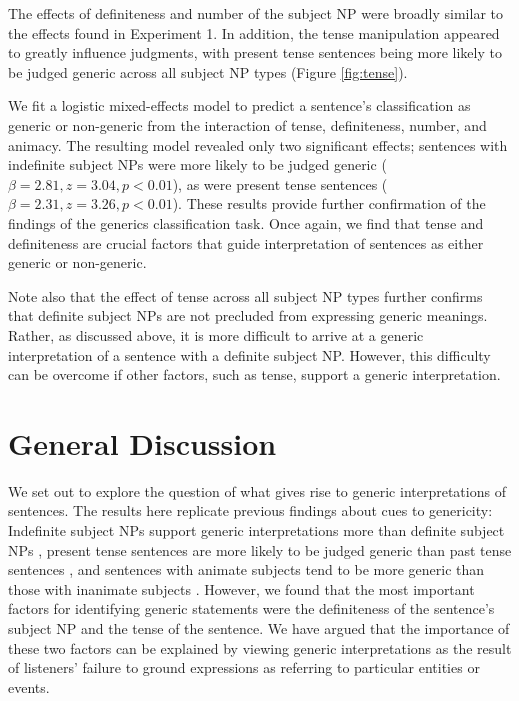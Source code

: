 \documentclass[10pt,letterpaper]{article}
\begin{document}
The effects of definiteness and number of the subject NP were broadly similar to the effects found in Experiment 1. In addition, the tense manipulation appeared to greatly influence judgments, with present tense sentences being more likely to be judged generic across all subject NP types (Figure \ref{fig:tense}).

We fit a logistic mixed-effects model to predict a sentence's classification as generic or non-generic from the interaction of tense, definiteness, number, and animacy. The resulting model revealed only two significant effects; sentences with indefinite subject NPs were more likely to be judged generic (\(\beta = 2.81, z = 3.04, p < 0.01\)), as were present tense sentences (\(\beta = 2.31, z = 3.26, p < 0.01\)). These results provide further confirmation of the findings of the generics classification task. Once again, we find that tense and definiteness are crucial factors that guide interpretation of sentences as either generic or non-generic.

Note also that the effect of tense across all subject NP types further confirms that definite subject NPs are not precluded from expressing generic meanings. Rather, as discussed above, it is more difficult to arrive at a generic interpretation of a sentence with a definite subject NP. However, this difficulty can be overcome if other factors, such as tense, support a generic interpretation.

\section{General Discussion}

We set out to explore the question of what gives rise to generic interpretations of sentences. The results here replicate previous findings about cues to genericity: Indefinite subject NPs support generic interpretations more than definite subject NPs \cite{Cimpian:2011, Gelman:2003}, present tense sentences are more likely to be judged generic than past tense sentences \cite{Cimpian:2011}, and sentences with animate subjects tend to be more generic than those with inanimate subjects \cite{Brandone:2009}. However, we found that the most important factors for identifying generic statements were the definiteness of the sentence's subject NP and the tense of the sentence. We have argued that the importance of these two factors can be explained by viewing generic interpretations as the result of listeners' failure to ground expressions as referring to particular entities or events.
\end{document}
